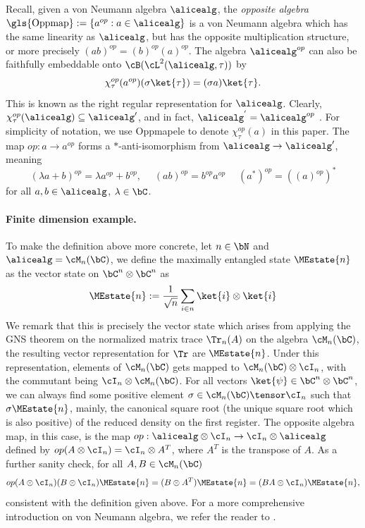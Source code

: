 Recall, given a von Neumann algebra $\alicealg$, the \textit{opposite algebra} $\text{\gls{Oppmap}} := \{a^{op}: a \in \alicealg \}$ is a von Neumann algebra which has the same linearity as $\alicealg$, but has the opposite multiplication structure, or more precisely $(ab)^{op} = (b)^{op} (a)^{op}$. The algebra $\alicealg^{op}$ can also be faithfully embeddable onto $\cB(\cL^2(\alicealg, \tau))$ by
\begin{equation} \label{eq:oppemb}
	\chi_{\tau}^{op}(a^{op}) (\sigma  \ket{\tau}) = (\sigma a) \ket{\tau}.
\end{equation}
This is known as the right regular representation for $\alicealg$. Clearly, $\chi_{\tau}^{op}(\alicealg)  \subseteq \alicealg'$, and in fact, $\alicealg^{'} = \alicealg^{op}$ \cite[Theorem 7.1.1]{anantharamanIntroductionII1Factors2010}. For simplicity of notation, we use \gls{Oppmapele} to denote $\chi_{\tau}^{op}(a)$ in this paper. The map $op: a \rightarrow a^{op}$ forms a $*$-anti-isomorphism from $\alicealg \rightarrow \alicealg'$, meaning 
\begin{equation*}
	(\lambda a + b)^{op} = \lambda a^{op} + b^{op}, \; \quad (ab)^{op} = b^{op} a^{op}  \; \quad (a^*)^{op} = ((a)^{op})^*
\end{equation*}
for all $a,b \in \alicealg$, $\lambda \in \bC$. 

\paragraph{Finite dimension example.} To make the definition above more concrete, let $n \in \bN$ and $\alicealg = \cM_n(\bC)$, we define the maximally entangled state $\MEstate{n}$ as the vector state on $\bC^{n} \otimes \bC^{n}$ as 
\begin{equation*}
\MEstate{n} := \frac{1}{\sqrt{n}} \sum_{i \in n} \ket{i} \otimes \ket{i}
\end{equation*}
We remark that this is precisely the vector state which arises from applying the GNS theorem on the normalized matrix trace $\Tr_n(A) $ on the algebra $\cM_n(\bC)$, the resulting vector representation for $\Tr$ are $\MEstate{n}$. Under this representation, elements of $\cM_n(\bC)$ gets mapped to $\cM_n(\bC) \otimes \cI_n$, with the commutant being $\cI_n \otimes \cM_n(\bC)$. For all vectors $\ket{\psi} \in \bC^{n} \otimes \bC^{n}$, we can always find some positive element $\sigma \in \cM_n(\bC) \tensor \cI_n$ such that $\sigma \MEstate{n}$, mainly, the canonical square root (the unique square root which is also positive) of the reduced density on the first register. The opposite algebra map, in this case, is the map $op: \alicealg \otimes \cI_n \rightarrow \cI_n \otimes \alicealg$ defined by $op(A \otimes \cI_n) = \cI_n \otimes A^{T}$, where $A^{T}$ is the transpose of $A$. As a further sanity check, for all $A,B \in \cM_n(\bC)$ 
\begin{equation}
	op(A \otimes \cI_n) (B \otimes \cI_n) \MEstate{n} = (B \otimes A^T) \MEstate{n}  = (B A\otimes \cI_n)\MEstate{n}, 
\end{equation}
consistent with the definition given above. For a more comprehensive introduction on von Neumann algebra, we refer the reader to \cite{blackadarOperatorAlgebras2006}.


